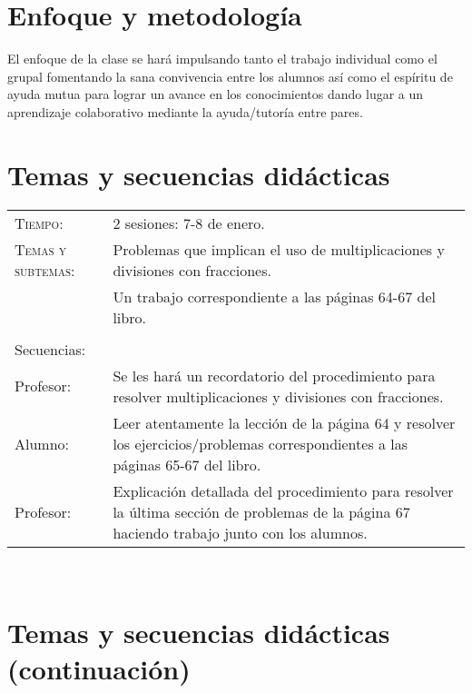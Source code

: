 \documentclass[letterpaper,10pt]{article}
\begin{document}
\vfill

\section{Enfoque y metodolog\'ia}

El enfoque de la clase se har\'a impulsando tanto el trabajo individual como el 
grupal fomentando la sana convivencia entre los alumnos as\'i como el esp\'iritu
de ayuda mutua para lograr un avance en los conocimientos dando lugar a un 
aprendizaje colaborativo mediante la ayuda/tutor\'ia entre pares.

\vfill

\section{Temas  y secuencias did\'acticas}
\begin{tabular}[t]{R{0.25\textwidth}p{0.71\textwidth}}
    \textsc{Tiempo:}          & 2 sesiones: 7-8 de enero. \\
    \textsc{Temas y subtemas:}& Problemas que implican el uso de 
    multiplicaciones y divisiones con fracciones.\\
    & Un trabajo correspondiente a las 
    p\'aginas 64-67 del libro. \\ \\
    \large{\sc Secuencias:} \\
    Profesor:   & Se les har\'a un recordatorio del procedimiento para resolver 
    multiplicaciones y divisiones con fracciones. \\
    Alumno:     & Leer atentamente la lecci\'on de la p\'agina 64 y resolver los 
    ejercicios/problemas correspondientes a las p\'aginas 65-67 del libro. \\
    Profesor: & Explicación detallada del procedimiento para resolver la \'ultima
    secci\'on de problemas de la p\'agina 67 haciendo trabajo junto con los 
    alumnos. \\ 
\hline
\end{tabular}
\\
\newpage
\section{Temas  y secuencias did\'acticas (continuaci\'on)}
\end{document}
